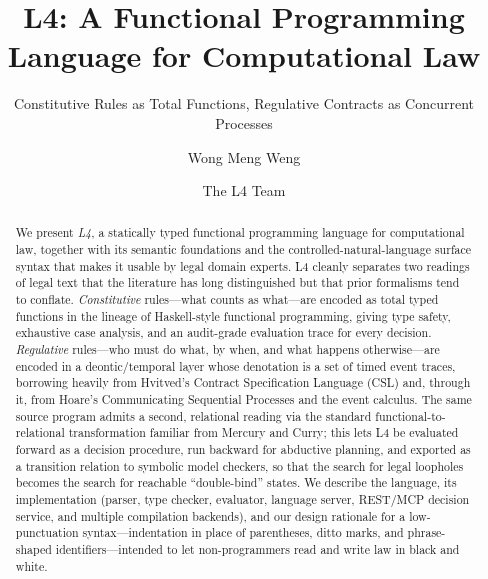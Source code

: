 \documentclass[sigconf,nonacm]{acmart}
\begin{document}
\title{L4: A Functional Programming Language for Computational Law}
\subtitle{Constitutive Rules as Total Functions, Regulative Contracts as Concurrent Processes}

\author{Wong Meng Weng}

\author{The L4 Team}

\renewcommand{\shortauthors}{Wong et al.}

\begin{abstract}
We present \emph{L4}, a statically typed functional programming language
for computational law, together with its semantic foundations and the
controlled-natural-language surface syntax that makes it usable by legal
domain experts. L4 cleanly separates two readings of legal text that the
literature has long distinguished but that prior formalisms tend to
conflate. \emph{Constitutive} rules---what counts as what---are encoded as
total typed functions in the lineage of Haskell-style functional
programming, giving type safety, exhaustive case analysis, and an
audit-grade evaluation trace for every decision. \emph{Regulative}
rules---who must do what, by when, and what happens otherwise---are encoded
in a deontic/temporal layer whose denotation is a set of timed event
traces, borrowing heavily from Hvitved's Contract Specification Language
(CSL) and, through it, from Hoare's Communicating Sequential Processes and
the event calculus.
The same source program admits a second, relational reading via the
standard functional-to-relational transformation familiar from Mercury and
Curry; this lets L4 be evaluated forward as a decision procedure, run
backward for abductive planning, and exported as a transition relation to
symbolic model checkers, so that the search for legal loopholes becomes the
search for reachable ``double-bind'' states. We describe the language, its
implementation (parser, type checker, evaluator, language server, REST/MCP
decision service, and multiple compilation backends), and our design
rationale for a low-punctuation syntax---indentation in place of
parentheses, ditto marks, and phrase-shaped identifiers---intended to let
non-programmers read and write law in black and white.
\end{abstract}
\end{document}
